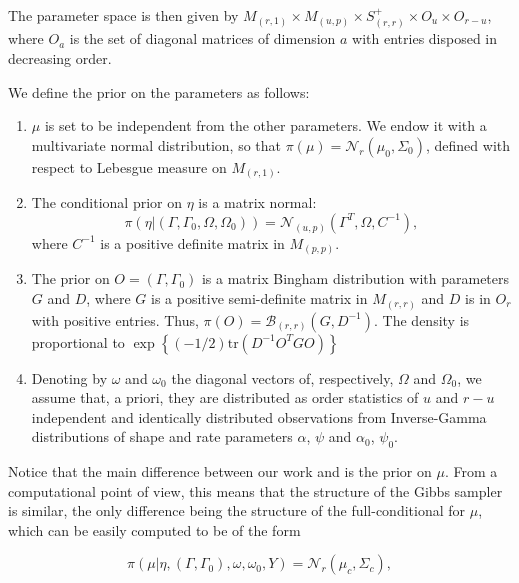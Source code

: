 \documentclass[graybox]{svmult}
\begin{document}
The parameter space is then given by
$M_{\left( r, 1 \right)} \times M_{\left( u, p \right)}\times
S^+_{\left( r, r \right)} \times O_u \times O_{r -u} $, where $O_a$ is
the set of diagonal matrices of dimension $a$ with entries disposed in
decreasing order.

We define the prior on the parameters as follows:

\begin{enumerate}
\item $\mu$ is set to be independent from the other parameters. We endow it with a multivariate normal distribution, so that $\pi \left( \mu \right) = \mathcal{N}_r \left( \mu_0, \Sigma_0 \right)$, defined with respect to Lebesgue measure on $M_{\left( r, 1 \right)}$.
\item The conditional prior on $\eta$ is a matrix normal: $$\pi \left( \eta | \left( \Gamma, \Gamma_0, \Omega, \Omega_0 \right) \right) = \mathcal{N}_{\left( u, p \right)}\left( \Gamma^T, \Omega, C^{-1} \right),$$ where $C^{-1}$ is a positive definite matrix in $M_{\left( p, p \right)}$.
\item The prior on $O = \left( \Gamma, \Gamma_0 \right)$ is a matrix Bingham distribution with parameters $G$ and $D$, where $G$ is a positive semi-definite matrix in $M_{\left( r, r \right)}$ and $D$ is in $O_r$ with positive entries. Thus, $\pi \left( O \right) = \mathcal{B}_{\left( r, r \right)}\left( G, D^{-1} \right)$. The density is proportional to $\exp{\left\{ \left(-1/2\right) \mathrm{tr}\left( D^{-1}O^TGO\right) \right\}}$
\item Denoting by $\omega$ and $\omega_0$ the diagonal vectors of, respectively, $\Omega$ and $\Omega_0$, we assume that, a priori, they are distributed as order statistics of $u$ and $r - u$ independent and identically distributed observations from Inverse-Gamma distributions of shape and rate parameters $\alpha$, $\psi$ and $\alpha_0$, $\psi_0$.
\end{enumerate}

Notice that the main difference between our work and
\cite{khareBayesianApproachEnvelope2017} is the prior on $\mu$. From a
computational point of view, this means that the structure of the
Gibbs sampler is similar, the only difference being the structure of
the full-conditional for $\mu$, which can be easily computed to be of
the form

\begin{equation}
  \label{eq:6}
  \pi \left( \mu | \eta, \left( \Gamma, \Gamma_0 \right), \omega, \omega_0, Y \right) = \mathcal{N}_r\left( \mu_{c}, \Sigma_{c} \right),
\end{equation}
\end{document}
